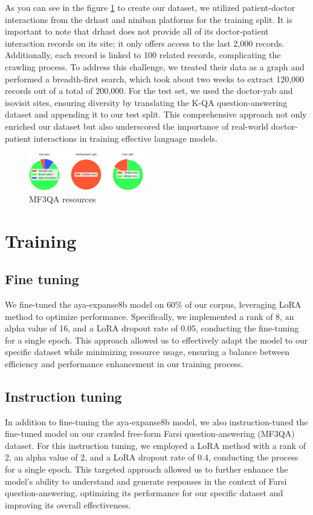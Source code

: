 \documentclass[conference]{IEEEtran}
\begin{document}
As you can see in the figure
\ref{fig2}
to create our dataset, we utilized patient-doctor interactions from the drhast and niniban platforms for the training split. It is important to note that drhast does not provide all of its doctor-patient interaction records on its site; it only offers access to the last 2,000 records. Additionally, each record is linked to 100 related records, complicating the crawling process. To address this challenge, we treated their data as a graph and performed a breadth-first search, which took about two weeks to extract 120,000 records out of a total of 200,000. For the test set, we used the doctor-yab and isovisit sites, ensuring diversity by translating the K-QA question-answering dataset
\cite{b25}
and appending it to our test split. This comprehensive approach not only enriched our dataset but also underscored the importance of real-world doctor-patient interactions in training effective language models.

\begin{figure}[htbp]
	\centerline{\includegraphics[width=0.45\textwidth]{fig2.png}}
	\caption{MF3QA resources}
	\label{fig2}
\end{figure}

\section{Training}
\subsection{Fine tuning}
We fine-tuned the aya-expanse8b model on 60\% of our corpus, leveraging LoRA
\cite{b13}
method to optimize performance. Specifically, we implemented a rank of 8, an alpha value of 16, and a LoRA dropout rate of 0.05, conducting the fine-tuning for a single epoch. This approach allowed us to effectively adapt the model to our specific dataset while minimizing resource usage, ensuring a balance between efficiency and performance enhancement in our training process.
\subsection{Instruction tuning}
In addition to fine-tuning the aya-expanse8b model, we also instruction-tuned the fine-tuned model on our crawled free-form Farsi question-answering (MF3QA) dataset. For this instruction tuning, we employed a LoRA method with a rank of 2, an alpha value of 2, and a LoRA dropout rate of 0.4, conducting the process for a single epoch. This targeted approach allowed us to further enhance the model’s ability to understand and generate responses in the context of Farsi question-answering, optimizing its performance for our specific dataset and improving its overall effectiveness.
\end{document}
